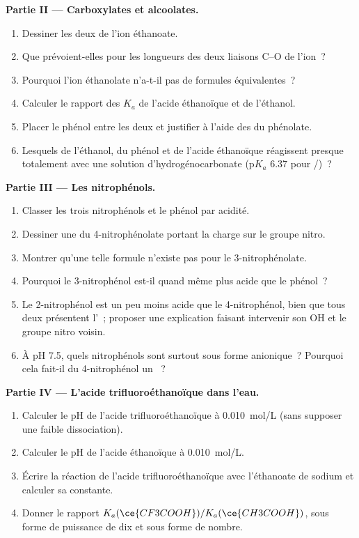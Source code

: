 \begin{problem}
\medskip
\noindent\textbf{Partie II --- Carboxylates et alcoolates.}
\begin{enumerate}[resume]
  \item Dessiner les deux  de l'ion éthanoate.
  \item Que prévoient-elles pour les longueurs des deux liaisons C--O de
        l'ion~?
  \item Pourquoi l'ion éthanolate n'a-t-il pas de formules équivalentes~?
  \item Calculer le rapport des $K_a$ de l'acide éthanoïque et de
        l'éthanol.
  \item Placer le phénol entre les deux et justifier à l'aide des
         du phénolate.
  \item Lesquels de l'éthanol, du phénol et de l'acide éthanoïque
        réagissent presque totalement avec une solution
        d'hydrogénocarbonate ($\mathrm{p}K_a$ 6.37 pour
        /)~?
\end{enumerate}

\medskip
\noindent\textbf{Partie III --- Les nitrophénols.}
\begin{enumerate}[resume]
  \item Classer les trois nitrophénols et le phénol par acidité.
  \item Dessiner une  du 4-nitrophénolate portant la
        charge sur le groupe nitro.
  \item Montrer qu'une telle formule n'existe pas pour le
        3-nitrophénolate.
  \item Pourquoi le 3-nitrophénol est-il quand même plus acide que le
        phénol~?
  \item Le 2-nitrophénol est un peu moins acide que le 4-nitrophénol,
        bien que tous deux présentent l'~; proposer une
        explication faisant intervenir son OH et le groupe nitro voisin.
  \item À pH 7.5, quels nitrophénols sont surtout sous forme anionique~?
        Pourquoi cela fait-il du 4-nitrophénol un ~?
\end{enumerate}

\medskip
\noindent\textbf{Partie IV --- L'acide trifluoroéthanoïque dans l'eau.}
\begin{enumerate}[resume]
  \item Calculer le pH de l'acide trifluoroéthanoïque à
        \qty{0.010}{mol/L} (sans supposer une faible dissociation).
  \item Calculer le pH de l'acide éthanoïque à \qty{0.010}{mol/L}.
  \item Écrire la réaction de l'acide trifluoroéthanoïque avec
        l'éthanoate de sodium et calculer sa constante.
  \item Donner le rapport $K_a(\ce{CF3COOH})/K_a(\ce{CH3COOH})$, sous
        forme de puissance de dix et sous forme de nombre.
\end{enumerate}
\end{problem}
